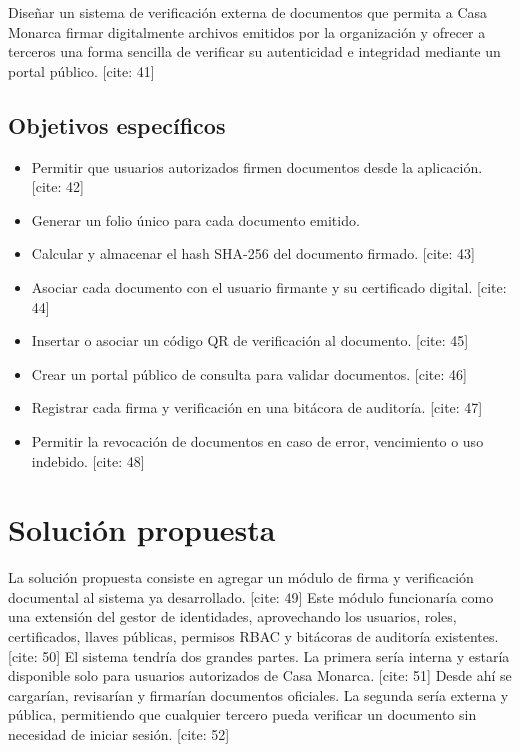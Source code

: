 \documentclass[10pt]{article} [cite: 1]
\begin{document}
Diseñar un sistema de verificación externa de documentos que permita a Casa Monarca firmar digitalmente archivos emitidos por la organización y ofrecer a terceros una forma sencilla de verificar su autenticidad e integridad mediante un portal público. [cite: 41]

\subsection{Objetivos específicos}

\begin{itemize}
    \item Permitir que usuarios autorizados firmen documentos desde la aplicación. [cite: 42]
    \item Generar un folio único para cada documento emitido.
    \item Calcular y almacenar el hash SHA-256 del documento firmado. [cite: 43]
    \item Asociar cada documento con el usuario firmante y su certificado digital. [cite: 44]
    \item Insertar o asociar un código QR de verificación al documento. [cite: 45]
    \item Crear un portal público de consulta para validar documentos. [cite: 46]
    \item Registrar cada firma y verificación en una bitácora de auditoría. [cite: 47]
    \item Permitir la revocación de documentos en caso de error, vencimiento o uso indebido. [cite: 48]
\end{itemize}

\section{Solución propuesta}

La solución propuesta consiste en agregar un módulo de firma y verificación documental al sistema ya desarrollado. [cite: 49] Este módulo funcionaría como una extensión del gestor de identidades, aprovechando los usuarios, roles, certificados, llaves públicas, permisos RBAC y bitácoras de auditoría existentes. [cite: 50] El sistema tendría dos grandes partes. La primera sería interna y estaría disponible solo para usuarios autorizados de Casa Monarca. [cite: 51] Desde ahí se cargarían, revisarían y firmarían documentos oficiales. La segunda sería externa y pública, permitiendo que cualquier tercero pueda verificar un documento sin necesidad de iniciar sesión. [cite: 52]
\end{document}
